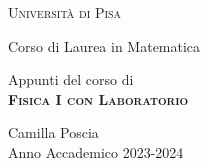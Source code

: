 \documentclass[italian,11pt,a4paper]{report}
\begin{document}
	
	\begin{titlepage}
		\centering
		
		\vspace{1cm}
		
		\textsc{\Huge Università di Pisa} \\
		\vspace{0.2cm}
		\hrulefill\par
		\vspace{0.4cm}
		{\large Corso di Laurea in Matematica} \\
		
		\vspace{7cm}
		
		{\Large Appunti del corso di}\\
		\vspace{0.75cm}
		\LARGE \textsc{\textbf{Fisica I con Laboratorio}} \\
		
		\vspace{7cm}
		
		\large Camilla Poscia \\
		
		\vspace{0.2cm}
		Anno Accademico 2023-2024 \\
		
		\vspace{1cm}
	\end{titlepage}
	
\end{document}
